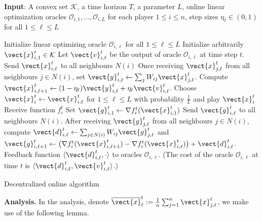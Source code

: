 \begin{algorithm}[ht]
\begin{flushleft}
\textbf{Input}:  A convex set $\mathcal{K}$, 
	a time horizon $T$, a parameter $L$, online linear optimization oracles $\mathcal{O}_{i,1}, \ldots, \mathcal{O}_{i,L}$ for each player $1 \leq i \leq n$, 
	step sizes $\eta_\ell \in (0, 1)$ for all $1 \leq \ell \leq L$
\end{flushleft}
\begin{algorithmic}[1]
\STATE Initialize linear optimizing oracle $\mathcal{O}_{i,\ell}$ for all $1 \leq \ell \leq L$
		\STATE Initialize arbitrarily $\vect{x}^t_{i,1} \in \mathcal{K}$ 
			\STATE Let $\vect{v}^{t}_{i,\ell}$ be the output of oracle $\mathcal{O}_{i,\ell}$ at time step $t$.
			\STATE Send $\vect{x}^{t}_{i,\ell}$ to all neighbours $N(i)$
			\STATE \label{alg:y} 
				Once receiving $\vect{x}^{t}_{j,\ell}$ from all neighbours $j \in N(i)$, 
				set $\vect{y}^{t}_{i,\ell} \gets \sum_{j} W_{ij} \vect{x}^{t}_{j,\ell}$.
			\STATE \label{alg:x} Compute $\vect{x}^{t}_{i,\ell+1} \gets (1 - \eta_{\ell}) \vect{y}^{t}_{i,\ell} + \eta_{\ell} \vect{v}^{t}_{i,\ell}$.
		\ENDFOR
		\STATE Choose $\vect{x}^{t}_{i} \gets \vect{x}^{t}_{i,\ell}$ for $1 \leq \ell \leq L$ with probability $\frac{1}{L}$ and play $\vect{x}^t_{i}$
		\STATE Receive function $f^{t}_{i}$ %
		\STATE Set $\vect{g}^{t}_{i,1} \gets \nabla f^{t}_{i}(\vect{x}^{t}_{i,1})$
				\STATE Send $\vect{g}^{t}_{i,\ell}$ to all neighbours $N(i)$.
				\STATE After receiving $\vect{g}^{t}_{j,\ell}$ from all neighbours $j \in N(i)$, compute
					$\vect{d}^{t}_{i,\ell} \gets  \sum_{j \in N(i)} W_{ij} \vect{g}^{t}_{j,\ell}$
					and
					$\vect{g}^{t}_{i,\ell + 1} \gets \bigl( \nabla f^{t}_{i}(\vect{x}^t_{i,\ell+1}) 
						-  \nabla f^{t}_{i}(\vect{x}^{t}_{i,\ell}) \bigr) + \vect{d}^{t}_{i,\ell}$.
				\STATE Feedback function $\langle \vect{d}^{t}_{i,\ell}, \cdot \rangle$ 
				to oracles $\mathcal{O}_{i,\ell}$. (The cost of the oracle $\mathcal{O}_{i,\ell}$ at time $t$ is 
				$\langle \vect{d}^{t}_{i,\ell}, \vect{v}^{t}_{i,\ell}  \rangle$.)
			\ENDFOR
	\ENDFOR
\ENDFOR
\end{algorithmic}
\caption{Decentralized online algorithm}
\label{algo:online-dist-FW}
\end{algorithm}

\textbf{Analysis.}
In the analysis, denote $\overline{\vect{x}}^{t}_{\ell} := \frac{1}{n} \sum_{j=1}^{n} \vect{x}^{t}_{j,\ell}$,
we make use of the following 
lemma.

